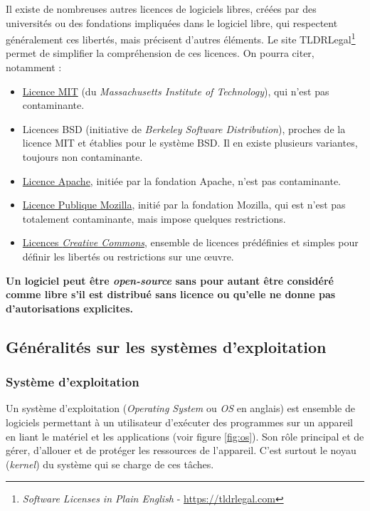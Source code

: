 Il existe de nombreuses autres licences de logiciels libres, créées par des universités ou des fondations impliquées dans le logiciel libre, qui respectent généralement ces libertés, mais précisent d'autres éléments. Le site TLDRLegal\footnote{\textit{Software Licenses in Plain English} - \href{https://tldrlegal.com}{https://tldrlegal.com}} permet de simplifier la compréhension de ces licences.
On pourra citer, notamment : 
\begin{itemize}
    \item \href{https://opensource.org/licenses/MIT}{Licence MIT} (du \textit{Massachusetts Institute of Technology}), qui n'est pas contaminante.
    \item Licences BSD (initiative de \textit{Berkeley Software Distribution}), proches de la licence MIT et établies pour le système BSD. Il en existe plusieurs variantes, toujours non contaminante.
    \item \href{https://www.apache.org/licenses}{Licence Apache}, initiée par la fondation Apache, n'est pas contaminante.
    \item \href{https://www.mozilla.org/en-US/MPL}{Licence Publique Mozilla}, initié par la fondation Mozilla, qui est n'est pas totalement contaminante, mais impose quelques restrictions.
    \item \href{https://creativecommons.org}{Licences \textit{Creative Commons}}, ensemble de licences prédéfinies et simples pour définir les libertés ou restrictions sur une œuvre.
\end{itemize} \vspace{\baselineskip}
 \textbf{Un logiciel peut être \textit{open-source} sans pour autant être considéré comme libre s'il est distribué sans licence ou qu'elle ne donne pas d'autorisations explicites.}

\newpage

\subsection{Généralités sur les systèmes d'exploitation}

\subsubsection{Système d'exploitation}

Un système d'exploitation (\textit{Operating System} ou \textit{OS} en anglais) est ensemble de logiciels permettant à un utilisateur d'exécuter des programmes sur un appareil en liant le matériel et les applications (voir figure \ref{fig:os}). Son rôle principal et de gérer, d'allouer et de protéger les ressources de l'appareil. C'est surtout le noyau (\textit{kernel}) du système qui se charge de ces tâches.

